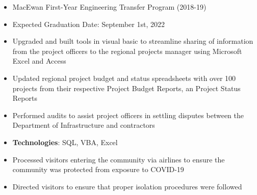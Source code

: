 \documentclass[10pt, letterpaper, ragged2e, withhyper]{altacv}
\begin{document}
\tagline{}

\makecvheader


\begin{paracol}{2}
        \begin{itemize}
            \item MacEwan First-Year Engineering Transfer Program (2018-19)
            \item Expected Graduation Date: September 1st, 2022
        \end{itemize}


            \begin{itemize}
                \item Upgraded and built tools in visual basic to streamline sharing of information from the project officers to the regional 
                projects manager using Microsoft Excel and Access 
                \item Updated regional project budget and status spreadsheets with over 100 projects from their respective Project 
                Budget Reports, an Project Status Reports
                \item Performed audits to assist project officers in settling disputes between the Department of Infrastructure and contractors 
                \item \textbf{Technologies}: SQL, VBA, Excel 
            \end{itemize}

            \begin{itemize}
                \item Processed visitors entering the community via airlines to ensure the community was protected from exposure to COVID-19
                \item Directed visitors to ensure that proper isolation procedures were followed
            \end{itemize}


\end{paracol}
\end{document}
